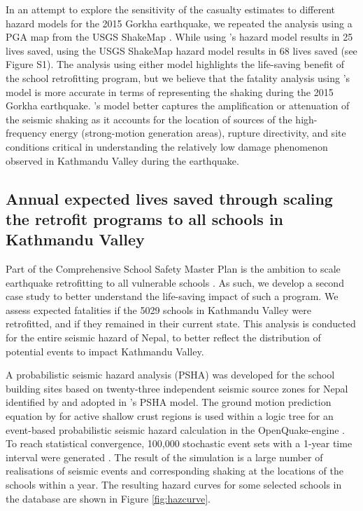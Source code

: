 \documentclass[utf8]{frontiersSCNS} %
\begin{document}
In an attempt to explore the sensitivity of the casualty estimates to different hazard models for the 2015 Gorkha earthquake, we repeated the analysis using a PGA map from the USGS ShakeMap \citep{shakemap2015nepal, wald2007topographic}. While using \cite{chen20192015}'s hazard model results in 25 lives saved, using the USGS ShakeMap hazard model results in 68 lives saved (see Figure S1).  The analysis using either model highlights the life-saving benefit of the school retrofitting program, but we believe that the fatality analysis using \cite{chen20192015}'s model is more accurate in terms of representing the shaking during the 2015 Gorkha earthquake. \cite{chen20192015}'s model better captures the amplification or attenuation of the seismic shaking as it accounts for the location of sources of the high-frequency energy (strong-motion generation areas), rupture directivity, and site conditions critical in understanding the relatively low damage phenomenon observed in Kathmandu Valley during the earthquake. 

\vspace{0.5cm} %

\subsection{Annual expected lives saved through scaling the retrofit programs to all schools in Kathmandu Valley}
\label{section-case2}

Part of the Comprehensive School Safety Master Plan is the ambition to scale earthquake retrofitting to all vulnerable schools \citep{cehrdc2018}. As such, we develop a second case study to better understand the life-saving impact of such a program. We assess expected fatalities if the 5029 schools in Kathmandu Valley were retrofitted, and if they remained in their current state. This analysis is conducted for the entire seismic hazard of Nepal, to better reflect the distribution of potential events to impact Kathmandu Valley.

A probabilistic seismic hazard analysis (PSHA) was developed for the school building sites based on twenty-three independent seismic source zones for Nepal identified by \cite{ram2013probabilistic} and adopted in \cite{chaulagain2015seismic}’s PSHA model. The ground motion prediction equation by \cite{chiou2014update} for active shallow crust regions is used within a logic tree for an event-based probabilistic seismic hazard calculation in the OpenQuake-engine \citep{silva2014development}. To reach statistical convergence, 100,000 stochastic event sets with a 1-year time interval were generated \citep{silva2016critical}. The result of the simulation is a large number of realisations of seismic events and corresponding shaking at the locations of the schools within a year. The resulting hazard curves for some selected schools in the database are shown in Figure \ref{fig:hazcurve}.
\end{document}
